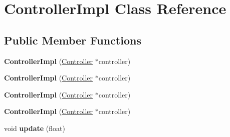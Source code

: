 \hypertarget{classControllerImpl}{}\section{Controller\+Impl Class Reference}
\label{classControllerImpl}
\subsection*{Public Member Functions}
\begin{DoxyCompactItemize}
\item 
\mbox{\label{classControllerImpl_aae1a355ae897b333c4fd8b4ead17a195}} 
{\bfseries Controller\+Impl} (\hyperlink{classController}{Controller} $\ast$controller)
\item 
\mbox{\label{classControllerImpl_aae1a355ae897b333c4fd8b4ead17a195}} 
{\bfseries Controller\+Impl} (\hyperlink{classController}{Controller} $\ast$controller)
\item 
\mbox{\label{classControllerImpl_aae1a355ae897b333c4fd8b4ead17a195}} 
{\bfseries Controller\+Impl} (\hyperlink{classController}{Controller} $\ast$controller)
\item 
\mbox{\label{classControllerImpl_aae1a355ae897b333c4fd8b4ead17a195}} 
{\bfseries Controller\+Impl} (\hyperlink{classController}{Controller} $\ast$controller)
\item 
\mbox{\label{classControllerImpl_afb2fa5bb22644ec5f84f9b87133c975a}} 
void {\bfseries update} (float)
\end{DoxyCompactItemize}
